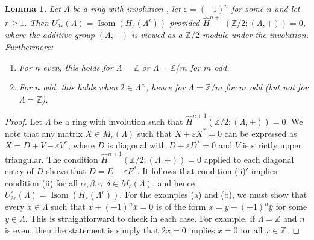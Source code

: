 \documentclass[11pt,a4paper,leqno]{amsart}
\newtheorem{lemma}[theorem]{Lemma}
\theoremstyle{definition}
\theoremstyle{remark}
\newenvironment{clist}[1]
{\begin{enumerate}[\normalfont #1]}
{\end{enumerate}}
\newcommand{\wh}{\widehat}
\newcommand{\Z}{\mathbb{Z}}
\DeclareMathOperator{\Isom}{Isom}
\renewcommand{\l}{\Lambda}
\newcommand{\La}{\Lambda}
\newcommand{\ep}{\varepsilon}
\newcommand{\U}{U^{\varepsilon}}
\begin{document}
\begin{lemma}
\label{example:unitary}
Let $\l$ be a ring with involution , let $\varepsilon = (-1)^n$ for some $n$ and let $r \ge 1$. Then $\U_{2r}(\l)=\Isom(H_\ep(\La^r))$ provided $\wh H^{n+1}(\Z/2;(\l,+))=0$, where the additive group $(\l,+)$ is viewed as a $\Z/2$-module under the involution.
Furthermore: 
\begin{clist}{(a)}
\item For $n$ even, this holds for $\Lambda = \Z$ or $\Lambda = \Z/m$ for $m$ odd.
\item For $n$ odd, this holds when $2 \in \Lambda^\times$, hence for $\Lambda = \Z/m$ for $m$ odd (but not for $\Lambda = \Z$).
\end{clist}
\end{lemma}

 
\begin{proof} Let $\l$ be a ring with involution such that $\wh H^{n+1}(\Z/2;(\La,+))=0$. 
We note that  
any matrix $X \in M_r(\La)$ such that $X +  \ep X^* = 0$ can be expressed as $X = D + V - \ep V^*$, where $D$ is diagonal with $D + \ep D^* = 0$ and $V$ is strictly upper triangular. The condition 
$\wh H^{n+1}(\Z/2;(\La,+))=0$ applied to each diagonal entry of $D$ shows that $D = E - \ep E^*$.
It follows that condition (ii)$'$ implies condition (ii) for all $\alpha, \beta, \gamma, \delta \in M_r(\l)$, and hence $\U_{2r}(\l)=\Isom(H_\ep(\La^r))$.
 For the examples (a) and (b), we must show that every $x \in \l$ such that $x+(-1)^n\bar{x}=0$ is of the form $x = y - (-1)^n\bar{y}$ for some $y \in \l$. This is straightforward to check in each case. For example, if $\l = \Z$ and $n$ is even, then the statement is simply that $2x=0$ implies $x=0$ for all $x \in \Z$.
\end{proof}
\end{document}
